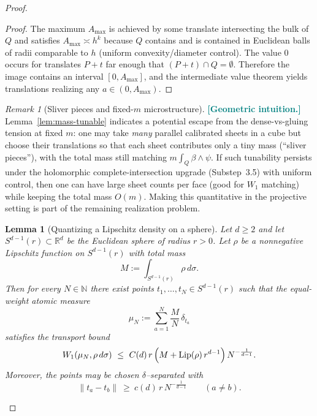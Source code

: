\documentclass[11pt]{article}
\newcommand{\REVMZ}[1]{\textcolor{teal}{#1}}  %
\numberwithin{equation}{section}  %
\theoremstyle{plain}
\newtheorem{lemma}[theorem]{Lemma}
\theoremstyle{definition}
\theoremstyle{remark}
\newtheorem{remark}[theorem]{Remark}
\newcommand{\R}{\mathbb{R}}
\newcommand{\N}{\mathbb{N}}
\begin{document}
\begin{proof}
\begin{proof}
The maximum $A_{\max}$ is achieved by some translate intersecting the bulk of $Q$ and satisfies $A_{\max}\asymp h^{k}$
because $Q$ contains and is contained in Euclidean balls of radii comparable to $h$ (uniform convexity/diameter control).
The value $0$ occurs for translates $P+t$ far enough that $(P+t)\cap Q=\emptyset$.
Therefore the image contains an interval $[0,A_{\max}]$, and the intermediate value theorem yields translations realizing any $a\in(0,A_{\max})$.
\end{proof}


\begin{remark}[Sliver pieces and fixed-$m$ microstructure]\label{rem:sliver}
\REVMZ{\textbf{[Geometric intuition.]}}
Lemma~\ref{lem:mass-tunable} indicates a potential escape from the dense-vs-gluing tension at fixed $m$:
one may take \emph{many} parallel calibrated sheets in a cube but choose their translations so that each sheet contributes only a tiny mass
(``sliver pieces''), with the total mass still matching $m\int_Q\beta\wedge\psi$.
If such tunability persists under the holomorphic complete-intersection upgrade (Substep~3.5) with uniform control, then one can have
large sheet counts per face (good for $W_1$ matching) while keeping the total mass $O(m)$.
Making this quantitative in the projective setting is part of the remaining realization problem.
\end{remark}


\begin{lemma}[Quantizing a Lipschitz density on a sphere]\label{lem:sphere-quantize}
Let $d\ge 2$ and let $S^{d-1}(r)\subset\R^d$ be the Euclidean sphere of radius $r>0$.
Let $\rho$ be a nonnegative Lipschitz function on $S^{d-1}(r)$ with total mass
\[
M:=\int_{S^{d-1}(r)} \rho\,d\sigma.
\]
Then for every $N\in\N$ there exist points $t_1,\dots,t_N\in S^{d-1}(r)$ such that the equal-weight atomic measure
\[
\mu_N:=\sum_{a=1}^N \frac{M}{N}\,\delta_{t_a}
\]
satisfies the transport bound
\[
W_1(\mu_N,\rho\,d\sigma)\ \le\ C(d)\,r\,\Bigl(M+\mathrm{Lip}(\rho)\,r^{d-1}\Bigr)\,N^{-\frac{1}{d-1}}.
\]
Moreover, the points may be chosen $\delta$--separated with
\[
\|t_a-t_b\|\ \ge\ c(d)\,r\,N^{-\frac{1}{d-1}}
\qquad (a\neq b).
\]
\end{lemma}



\end{proof}
\end{document}
